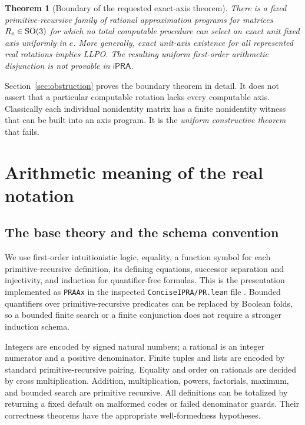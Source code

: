 \documentclass[11pt]{article}
\newtheorem{theorem}{Theorem}[section]
\theoremstyle{definition}\newtheorem{definition}[theorem]{Definition}
\newcommand{\ipra}{\mathsf{iPRA}}
\begin{document}
\begin{theorem}[Boundary of the requested exact-axis theorem]\label{thm:boundary}
There is a fixed primitive-recursive family of rational approximation
programs for matrices $R_e\in\operatorname{SO}(3)$ for which no total computable procedure
can select an exact unit fixed axis uniformly in $e$. More generally,
exact unit-axis existence for all represented real rotations implies LLPO.
The resulting uniform first-order arithmetic disjunction is not provable
in $\ipra$.
\end{theorem}

Section~\ref{sec:obstruction} proves the boundary theorem in detail. It does
not assert that a particular computable rotation lacks every computable
axis. Classically each individual nonidentity matrix has a finite
nonidentity witness that can be built into an axis program. It is the
\emph{uniform constructive theorem} that fails.

\section{Arithmetic meaning of the real notation}\label{sec:arithmetic}

\subsection{The base theory and the schema convention}
We use first-order intuitionistic logic, equality, a function symbol for each
primitive-recursive definition, its defining equations, successor separation
and injectivity, and induction for quantifier-free formulas. This is the
presentation implemented as \texttt{PRAAx} in the inspected
\texttt{ConciseIPRA/PR.lean} file \cite{proveit}. Bounded quantifiers over
primitive-recursive predicates can be replaced by Boolean folds, so a
bounded finite search or a finite conjunction does not require a stronger
induction schema.

Integers are encoded by signed natural numbers; a rational is an integer
numerator and a positive denominator. Finite tuples and lists are encoded
by standard primitive-recursive pairing. Equality and order on rationals
are decided by cross multiplication. Addition, multiplication, powers,
factorials, maximum, and bounded search are primitive recursive. All
definitions can be totalized by returning a fixed default on malformed
codes or failed denominator guards. Their correctness theorems have the
appropriate well-formedness hypotheses.
\end{document}
